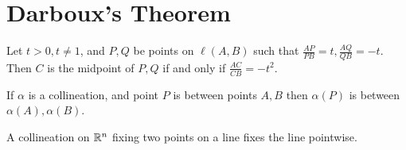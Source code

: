 \section{Darboux's Theorem}

\begin{lemma}
    Let \(t > 0, t \neq 1\), and \(P, Q\) be points on \(\ell(A, B)\) such that \(\frac{AP}{PB} = t, \frac{AQ}{QB} = -t\). Then \(C\) is the midpoint of \(P, Q\) if and only if \(\frac{AC}{CB} = -t^2\).
\end{lemma}

\begin{theorem}
    If \(\alpha\) is a collineation, and point \(P\) is between points \(A, B\) then \(\alpha(P)\) is between \(\alpha(A), \alpha(B)\).
\end{theorem}

\begin{corollary}
    A collineation on \(\mathbb{R}^n\) fixing two points on a line fixes the line pointwise.
\end{corollary}

\pagebreak
